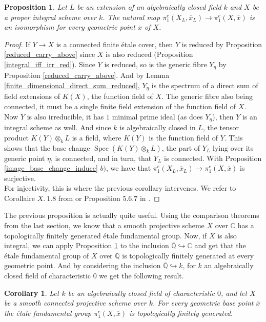 \documentclass{article}
\theoremstyle{plain}
\newtheorem{proposition}[theorem]{Proposition}
\newtheorem{corollary}[theorem]{Corollary}
\theoremstyle{definition}
\DeclareMathOperator{\Spec}{Spec}
\begin{document}
\begin{proposition}
\label{invariant_under_field_extension}
    Let $L$ be an extension of an algebraically closed field $k$ and $X$ be a proper integral scheme over $k$.
    The natural map $\pi^e_1(X_L,\overline{x}_L)\rightarrow \pi^e_1(X,\overline{x})$ is an isomorphism for every geometric point $\overline{x}$ of $X$.
\end{proposition}
\begin{proof}
    If $Y\rightarrow X$ is a connected finite \'etale cover, then $Y$ is reduced by Proposition \ref{reduced_carry_above} since $X$ is also reduced (Proposition \ref{integral_iff_irr_red}).
    Since $Y$ is reduced, so is the generic fibre $Y_{\eta}$ by Proposition \ref{reduced_carry_above}.
    And by Lemma \ref{finite_dimensional_direct_sum_reduced}, $Y_{\eta}$ is the spectrum of a direct sum of field extensions of $K(X)$, the function field of $X$. 
    The generic fibre also being connected, it must be a single finite field extension of the function field of $X$.
    Now $Y$ is also irreducible, it has $1$ minimal prime ideal (as does $Y_{\eta}$), then $Y$ is an integral scheme as well.
    And since $k$ is algebraically closed in $L$, the tensor product $K(Y)\otimes_k L$ is a field, where $K(Y)$ is the function field of $Y$.
    This shows that the base change $\Spec (K(Y)\otimes_kL)$, the part of $Y_L$ lying over its generic point $\eta$, is connected, and in turn, that $Y_L$ is connected.
    With Proposition \ref{image_base_change_induce} $b)$, we have that  $\pi^e_1(X_L,\overline{x}_L) \rightarrow \pi^e_1(X,\overline{x})$ is surjective.\\
    For injectivity, this is where the previous corollary intervenes. 
    We refer to Corollaire $X.\:1.8$ from \cite{SGA} or Proposition $5.6.7$ in \cite{Szamuely}.
\end{proof}

\noindent The previous proposition is actually quite useful.
Using the comparison theorems from the last section, we know that a smooth projective scheme $X$ over $\mathbb{C}$ has a topologically finitely generated \'etale fundamental group.
Now, if $X$ is also integral, we can apply Proposition \ref{invariant_under_field_extension} to the inclusion $\overline{\mathbb{Q}} \hookrightarrow \mathbb{C}$ and get that the \'etale fundamental group of $X$ over $\overline{\mathbb{Q}}$ is topologically finitely generated at every geometric point.
And by considering the inclusion $\overline{\mathbb{Q}}\hookrightarrow k$, for $k$ an algebraically closed field of characteristic $0$ we get the following result.
\begin{corollary}
\label{lats_thm}
    Let $k$ be an algebraically closed field of characteristic $0$, and let $X$ be a smooth connected projective scheme over $k$. For every geometric base point $\overline{x}$ the \'etale fundamental group $\pi^e_1(X,\overline{x})$ is topologically finitely generated.
\end{corollary}
\end{document}
